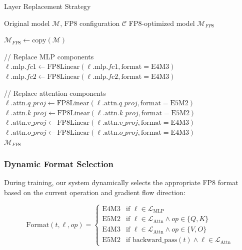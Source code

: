 \documentclass[conference]{IEEEtran}
\begin{document}
\begin{algorithm}[hbt!]
\caption{Layer Replacement Strategy}
\label{alg:layer_replacement}
\begin{algorithmic}
\Require Original model $\mathcal{M}$, FP8 configuration $\mathcal{C}$
\Ensure FP8-optimized model $\mathcal{M}_{FP8}$

\State $\mathcal{M}_{FP8} \gets \text{copy}(\mathcal{M})$

    \State // Replace MLP components
    \State $\ell.\text{mlp}.fc1 \gets \text{FP8Linear}(\ell.\text{mlp}.fc1, \text{format}=\text{E4M3})$
    \State $\ell.\text{mlp}.fc2 \gets \text{FP8Linear}(\ell.\text{mlp}.fc2, \text{format}=\text{E4M3})$
    
    \State // Replace attention components
    \State $\ell.\text{attn}.q\_proj \gets \text{FP8Linear}(\ell.\text{attn}.q\_proj, \text{format}=\text{E5M2})$
    \State $\ell.\text{attn}.k\_proj \gets \text{FP8Linear}(\ell.\text{attn}.k\_proj, \text{format}=\text{E5M2})$
    \State $\ell.\text{attn}.v\_proj \gets \text{FP8Linear}(\ell.\text{attn}.v\_proj, \text{format}=\text{E4M3})$
    \State $\ell.\text{attn}.o\_proj \gets \text{FP8Linear}(\ell.\text{attn}.o\_proj, \text{format}=\text{E4M3})$
\EndFor
\vspace{0.3cm}\\
\hline
\Statex \Return $\mathcal{M}_{FP8}$
\end{algorithmic}
\end{algorithm}

\subsubsection{Dynamic Format Selection}
During training, our system dynamically selects the appropriate FP8 format based on the current operation and gradient flow direction:

\begin{equation}
\text{Format}(t, \ell, op) = \begin{cases}
\text{E4M3} & \text{if } \ell \in \mathcal{L}_{\mathrm{MLP}} \\
\text{E5M2} & \text{if } \ell \in \mathcal{L}_{\mathrm{Attn}} \land op \in \{Q, K\} \\
\text{E4M3} & \text{if } \ell \in \mathcal{L}_{\mathrm{Attn}} \land op \in \{V, O\} \\
\text{E5M2} & \text{if } \text{backward\_pass}(t) \land \ell \in \mathcal{L}_{\mathrm{Attn}}
\end{cases}
\end{equation}
\end{document}
